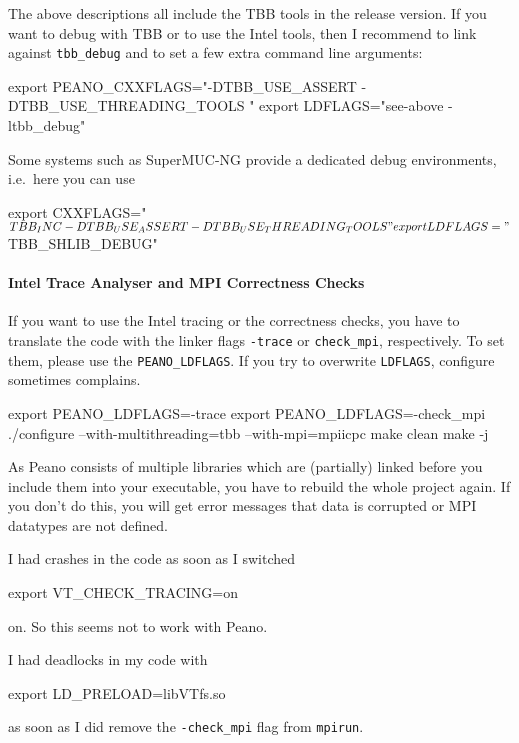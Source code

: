 The above descriptions all include the TBB tools in the release version.
If you want to debug with TBB or to use the Intel tools, then I recommend to
link against \texttt{tbb\_debug} and to set a few extra command line arguments:

\begin{code}
 export PEANO_CXXFLAGS="-DTBB_USE_ASSERT -DTBB_USE_THREADING_TOOLS "
 export LDFLAGS="see-above   -ltbb_debug"
\end{code}

\noindent
Some systems such as SuperMUC-NG provide a dedicated debug environments,
i.e.~here you can use
\begin{code}
 export CXXFLAGS="$TBB_INC -DTBB_USE_ASSERT -DTBB_USE_THREADING_TOOLS "
 export LDFLAGS="$TBB_SHLIB_DEBUG"
\end{code}


\paragraph{Intel Trace Analyser and MPI Correctness Checks}

If you want to use the Intel tracing or the correctness checks, you have to
translate the code with the linker flags \texttt{-trace} or \texttt{check\_mpi},
respectively.
To set them, please use the \texttt{PEANO\_LDFLAGS}.
If you try to overwrite \texttt{LDFLAGS}, configure sometimes complains.


\begin{code}
 export PEANO_LDFLAGS=-trace
 export PEANO_LDFLAGS=-check_mpi
 ./configure --with-multithreading=tbb --with-mpi=mpiicpc
 make clean
 make -j
\end{code}


\noindent
As Peano consists of multiple libraries which are (partially) linked before you
include them into your executable, you have to rebuild the whole project again.
If you don't do this, you will get error messages that data is corrupted or MPI
datatypes are not defined.



\begin{remark}
 I had crashes in the code as soon as I switched
 \begin{code}
 export VT_CHECK_TRACING=on
 \end{code}
 on. So this seems not to work with Peano.
\end{remark}



\begin{remark}
 I had deadlocks in my code with
 \begin{code}
 export LD_PRELOAD=libVTfs.so
 \end{code}
 as soon as I did remove the \texttt{-check\_mpi} flag from \texttt{mpirun}.
\end{remark}



